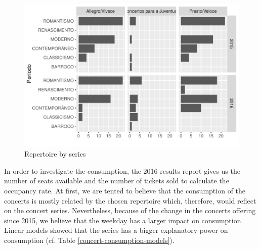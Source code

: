 \documentclass[a4paper, 12pt, openright, oneside, german, french, brazil, english]{abntex2}
\begin{document}
        \begin{figure}[!h]
          \centering
          \caption{Repertoire by series}
          \label{repertoire-perseries}
          \includegraphics[scale=1]{periodo_perserie_year.pdf}
        \end{figure}


        In order to investigate the consumption, the 2016 results report gives us the number of seats available and the number of tickets sold to calculate the occupancy rate. At first, we are tented to believe that the consumption of the concerts is mostly related by the chosen repertoire which, therefore, would reflect on the concert series. Nevertheless, because of the change in the concerts offering since 2015, we believe that the weekday has a larger impact on consumption. Linear models showed that the series has a bigger explanatory power on consumption (cf. Table \ref{concert-consumption-models}).
\end{document}
